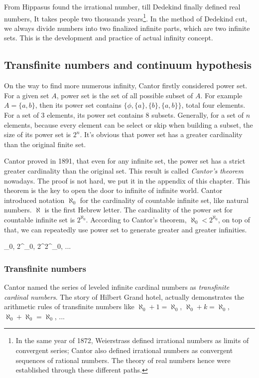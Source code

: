 \documentclass{article}
\begin{document}
From Hippasus found the irrational number, till Dedekind finally defined real numbers, It takes people two thousands years\footnote{In the same year of 1872, Weierstrass defined irrational numbers as limits of convergent series; Cantor also defined irrational numbers as convergent sequences of rational numbers. The theory of real numbers hence were established through these different paths.}. In the method of Dedekind cut, we always divide numbers into two finalized infinite parts, which are two infinite sets. This is the development and practice of actual infinity concept.

\subsection{Transfinite numbers and continuum hypothesis}
On the way to find more numerous infinity, Cantor firstly considered power set. For a given set $A$, power set is the set of all possible subset of $A$. For example $A = \{a, b\}$, then its power set contains $\{\phi, \{a\}, \{b\}, \{a, b\}\}$, total four elements. For a set of 3 elements, its power set contains 8 subsets. Generally, for a set of $n$ elements, because every element can be select or skip when building a subset, the size of its power set is $2^n$. It's obvious that power set has a greater cardinality than the original finite set.

Cantor proved in 1891, that even for any infinite set, the power set has a strict greater cardinality than the original set. This result is called {\em Cantor's theorem} nowadays. The proof is not hard, we put it in the appendix of this chapter. This theorem is the key to open the door to infinite of infinite world. Cantor introduced notation $\aleph_0$ for the cardinality of countable infinite set, like natural numbers. $\aleph$ is the first Hebrew letter. The cardinality of the power set for countable infinite set is $2^{\aleph_0}$. According to Cantor's theorem, $\aleph_0 < 2^{\aleph_0}$, on top of that, we can repeatedly use power set to generate greater and greater infinities.

\be
\aleph_0, 2^{\aleph_0}, 2^{2^{\aleph_0}}, ...
\ee

\subsubsection{Transfinite numbers}

Cantor named the series of leveled infinite cardinal numbers as {\em transfinite cardinal numbers}. The story of Hilbert Grand hotel, actually demonstrates the arithmetic rules of transfinite numbers like $\aleph_0 + 1 = \aleph_0$, $\aleph_0 + k = \aleph_0 $, $\aleph_0 + \aleph_0 = \aleph_0$, ...
\end{document}
